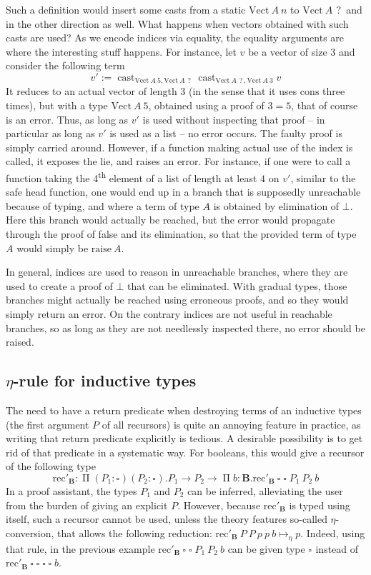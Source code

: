 \documentclass[en]{myarticle}
\renewcommand{\mathtt}{\mathrm}
\newcommand{\uni}[1][]{\square_{#1}}
\newcommand{\red}{\mapsto}
\renewcommand{\P}{\operatorname{\Pi}}
\DeclareMathOperator{\?}{?}
\newcommand{\rec}{\mathtt{rec}}
\newcommand{\bool}{\mathbf{B}}
\newcommand{\ve}{\mathtt{Vect}}
\newcommand{\con}{\mathtt{cons}}
\newcommand{\cas}{\operatorname{\mathtt{cast}}}
\newcommand{\cast}[3]{\cas_{#1,#2}#3}
\newcommand{\rai}{\mathtt{raise}}
\begin{document}
{Such a definition would insert some casts from a static $\ve~A~n$ to $\ve~A~\?$ and in the other direction as well. What happens when vectors obtained with such casts are used? As we encode indices via equality, the equality arguments are where the interesting stuff happens. For instance, let $v$ be a vector of size $3$ and consider the following term
\[v' := \cast{\ve~A~5}{\ve~A~\?}{\cast{\ve~A~\?}{\ve~A~3}{v}}\]
It reduces to an actual vector of length $3$ (in the sense that it uses $\con$ three times), but with a type $\ve~A~5$, obtained using a proof of $3 = 5$, that of course is an error. Thus, as long as $v'$ is used without inspecting that proof – in particular as long as $v'$ is used as a list – no error occurs. The faulty proof is simply carried around. However, if a function making actual use of the index is called, it exposes the lie, and raises an error. For instance, if one were to call a function taking the 4\textsuperscript{th} element of a list of length at least $4$ on $v'$, similar to the safe head function, one would end up in a branch that is supposedly unreachable because of typing, and where a term of type $A$ is obtained by elimination of $\bot$. Here this branch would actually be reached, but the error would propagate through the proof of false and its elimination, so that the provided term of type $A$ would simply be $\rai~A$.

In general, indices are used to reason in unreachable branches, where they are used to create a proof of $\bot$ that can be eliminated. With gradual types, those branches might actually be reached using erroneous proofs, and so they would simply return an error. On the contrary indices are not useful in reachable branches, so as long as they are not needlessly inspected there, no error should be raised.

\subsection{$\eta$-rule for inductive types}

The need to have a return predicate when destroying terms of an inductive types (the first argument $P$ of all recursors) is quite an annoying feature in practice, as writing that return predicate explicitly is tedious. A desirable possibility is to get rid of that predicate in a systematic way. For booleans, this would give a recursor of the following type
\[\rec'_{\bool} : \P (P_1 : \uni) (P_2 : \uni). P_1 \to P_2 \to \P b : \bool. \rec'_{\bool}~\uni~\uni~P_1~P_2~b \]
In a proof assistant, the types $P_1$ and $P_2$ can be inferred, alleviating the user from the burden of giving an explicit $P$. However, because $\rec'_{\bool}$ is typed using itself, such a recursor cannot be used, unless the theory features so-called $\eta$-conversion, that allows the following reduction: $\rec'_{\bool}~P~P~p~p~b \red_\eta p$.
Indeed, using that rule, in the previous example $\rec'_{\bool}~\uni~\uni~P_1~P_2~b$ can be given type $\uni$ instead of $\rec'_{\bool}~\uni~\uni~\uni~\uni~b$.

}
\end{document}
